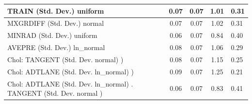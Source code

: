 \begin{table}
\begin{center}
\begin{tabular}{|l|l|c|c|c|l|}
			\hline
			TRAIN (Std. Dev.) uniform &  & 0.07 & 0.07 & 1.01 & 0.31 \\
			\hline
			MXGRDIFF (Std. Dev.) normal &  & 0.07 & 0.07 & 1.02 & 0.31 \\
			\hline
			MINRAD (Std. Dev.) uniform &  & 0.06 & 0.07 & 0.84 & 0.40 \\
			\hline
			AVEPRE (Std. Dev.) ln_normal &  & 0.08 & 0.07 & 1.06 & 0.29 \\
			\hline
			 Chol: TANGENT (Std. Dev. normal) ) &  & 0.08 & 0.07 & 1.15 & 0.25 \\
			\hline
			 Chol: ADTLANE (Std. Dev. ln_normal) ) &  & 0.09 & 0.07 & 1.25 & 0.21 \\
			\hline
			 Chol: ADTLANE (Std. Dev. ln_normal) . TANGENT (Std. Dev.   normal ) &  & 0.06 & 0.07 & 0.83 & 0.41 \\
			\hline
		\end{tabular}
	\end{center}
\end{table}
